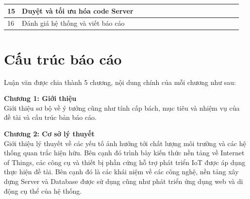 \begin{landscape}
\begin{table}[]
\begin{tabular}{|l|l|l|l|l|l|l|l|l|l|l|l|l|l|l|l|l|}
15                                          & Duyệt và tối ưu hóa code Server                                                                                  &                          &                                                 &                          &                          &                          &                          &                                                 &                          &                          &                                                 &                          & \cellcolor[HTML]{000000} & \cellcolor[HTML]{000000} &                          &                          \\ \hline
16                                          & Đánh giá hệ thống và viết báo cáo                                                                                &                          &                                                 &                          &                          &                          &                          &                                                 &                          &                          &                                                 &                          &                          & \cellcolor[HTML]{000000} & \cellcolor[HTML]{000000} & \cellcolor[HTML]{000000} \\ \hline
\end{tabular}
\end{table}
\end{landscape}


\section{Cấu trúc báo cáo} %
Luận văn được chia thành 5 chương, nội dung chính của mỗi chương như sau:

\textbf{Chương 1: Giới thiệu}\\
Giới thiệu sơ bộ về ý tưởng cũng như tính cấp bách, mục tiêu và nhiệm vụ của đề tài và cấu trúc bản báo cáo.

\textbf{Chương 2: Cơ sở lý thuyết}\\
Giới thiệu lý thuyết về các yếu tố ảnh hưởng tới chất lượng môi trường và các hệ thống quan trắc hiện hữu. Bên cạnh đó trình bày kiến thức nền tảng về Internet of Things, các công cụ và thiết bị phần cứng hỗ trợ phát triển IoT được áp dụng thực hiện đề tài. Bên cạnh đó là các khái niệm về các công nghệ, nền tảng xây dựng Server và Database được sử dụng cũng như phát triển ứng dụng web và di động cụ thể của hệ thống.


